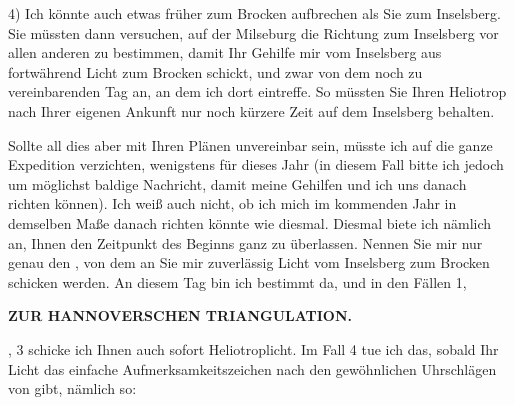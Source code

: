 \par\noindent\hspace*{\parindent}4) Ich könnte auch etwas früher zum Brocken aufbrechen als Sie zum Inselsberg. Sie müssten dann versuchen, auf der Milseburg die Richtung zum Inselsberg vor allen anderen zu bestimmen, damit Ihr Gehilfe mir vom Inselsberg aus fortwährend Licht zum Brocken schickt, und zwar von dem noch zu vereinbarenden Tag an, an dem ich dort eintreffe.
So müssten Sie Ihren Heliotrop nach Ihrer eigenen Ankunft nur noch kürzere Zeit auf dem Inselsberg behalten.
\par\noindent\hspace*{\parindent}Sollte all dies aber mit Ihren Plänen unvereinbar sein, müsste ich auf die ganze Expedition verzichten, wenigstens für dieses Jahr (in diesem Fall bitte ich jedoch um möglichst baldige Nachricht, damit meine Gehilfen und ich uns danach richten können). Ich weiß auch nicht, ob ich mich im kommenden Jahr in demselben Maße danach richten könnte wie diesmal.
Diesmal biete ich nämlich an, Ihnen den Zeitpunkt des Beginns ganz zu überlassen.
Nennen Sie mir nur genau den , von dem an Sie mir zuverlässig Licht vom Inselsberg zum Brocken schicken werden.
An diesem Tag bin ich bestimmt da, und in den Fällen 1,
\par\clearpage
\noindent\null\hfill{\small\textbf{ZUR HANNOVERSCHEN TRIANGULATION.}}\hfill{}\par\medskip
{}, 3 schicke ich Ihnen auch sofort Heliotroplicht. Im Fall 4 tue ich das, sobald Ihr Licht das einfache Aufmerksamkeitszeichen nach den gewöhnlichen Uhrschlägen von  gibt, nämlich so:
\par\smallskip
{\centering
{}\par}
